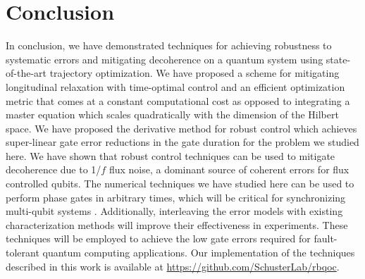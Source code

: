 \section{Conclusion}
In conclusion, we have demonstrated techniques for achieving robustness to systematic
errors and mitigating decoherence on a quantum system using state-of-the-art trajectory
optimization. We have proposed a scheme for mitigating longitudinal relaxation with time-optimal
control and an efficient optimization metric that comes at a constant computational cost as
opposed to integrating a master equation which scales quadratically with
the dimension of the Hilbert space.
We have proposed the derivative method for robust control which achieves
super-linear gate error reductions in the gate duration for the problem we studied here.
We have shown that robust control techniques can be used to mitigate decoherence due
to 1/$f$ flux noise, a dominant source of coherent errors for flux controlled qubits.
The numerical techniques we have studied here can be used to perform phase gates in arbitrary times,
which will be critical for synchronizing multi-qubit systems 
. 
Additionally, interleaving the error models with existing
characterization methods will improve their effectiveness in experiments.
These techniques will be employed to achieve the low gate errors
required for fault-tolerant quantum computing applications. Our
implementation of the techniques described in this work is available
at \url{https://github.com/SchusterLab/rbqoc}.
